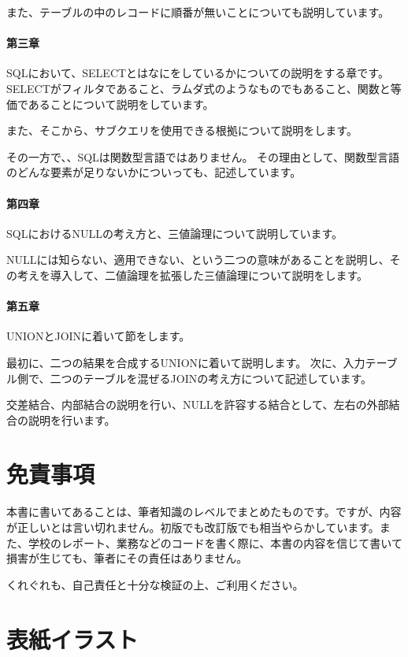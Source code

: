 また、テーブルの中のレコードに順番が無いことについても説明しています。


\paragraph{第三章}

SQLにおいて、SELECTとはなにをしているかについての説明をする章です。
SELECTがフィルタであること、ラムダ式のようなものでもあること、関数と等価であることについて説明をしています。

また、そこから、サブクエリを使用できる根拠について説明をします。

その一方で、、SQLは関数型言語ではありません。
その理由として、関数型言語のどんな要素が足りないかについっても、記述しています。

\paragraph{第四章}

SQLにおけるNULLの考え方と、三値論理について説明しています。

NULLには知らない、適用できない、という二つの意味があることを説明し、その考えを導入して、二値論理を拡張した三値論理について説明をします。

\paragraph{第五章}

UNIONとJOINに着いて節をします。

最初に、二つの結果を合成するUNIONに着いて説明します。
次に、入力テーブル側で、二つのテーブルを混ぜるJOINの考え方について記述しています。

交差結合、内部結合の説明を行い、NULLを許容する結合として、左右の外部結合の説明を行います。

\section*{免責事項}
本書に書いてあることは、筆者知識のレベルでまとめたものです。ですが、内容が正しいとは言い切れません。初版でも改訂版でも相当やらかしています。また、学校のレポート、業務などのコードを書く際に、本書の内容を信じて書いて損害が生じても、筆者にその責任はありません。

くれぐれも、自己責任と十分な検証の上、ご利用ください。

\section*{表紙イラスト}
